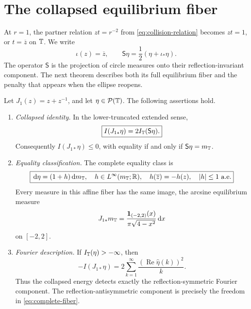 \section{The collapsed equilibrium fiber}\label{sec:collapsed-fiber}

At \(r=1\), the partner relation \(zt=r^{-2}\) from
\eqref{eq:collision-relation} becomes \(zt=1\), or
\(t=\overline z\) on \(\mathbb{T}\).  We write
\[
 \iota(z)=\overline z,
 \qquad
 \mathsf S\eta=\frac12(\eta+\iota_\ast\eta).
\]
The operator \(\mathsf S\) is the projection of circle measures onto
their reflection-invariant component.  The next theorem describes both
its full equilibrium fiber and the penalty that appears when the
ellipse reopens.

\begin{theorem}\label{thm:collapsed-selection}
Let \(J_1(z)=z+z^{-1}\), and let
\(\eta\in\mathcal P(\mathbb{T})\).  The following assertions hold.

\begin{enumerate}[label=\textup{(\alph*)},leftmargin=*]
\item \emph{Collapsed identity.}  In the lower-truncated extended
sense,
\begin{equation}\label{eq:collapsed-identity}
 \boxed{I(J_{1\ast}\eta)=2I_{\mathbb{T}}(\mathsf S\eta).}
\end{equation}
Consequently \(I(J_{1\ast}\eta)\leq0\), with equality if and only if
\(\mathsf S\eta=m_{\mathbb{T}}\).

\item \emph{Equality classification.}  The complete equality class is
\begin{equation}\label{eq:complete-fiber}
 \boxed{
 \,\mathrm{d}\eta=(1+h)\,\mathrm{d} m_{\mathbb{T}},\quad
 h\in L^\infty(m_{\mathbb{T}};\mathbb{R}),\quad
 h(\overline z)=-h(z),\quad |h|\leq1\ \text{a.e.}}
\end{equation}
Every measure in this affine fiber has the same image, the arcsine
equilibrium measure
\begin{equation}\label{eq:arcsine-measure}
 J_{1\ast}m_{\mathbb{T}}
 =\frac{\mathbf1_{(-2,2)}(x)}{\pi\sqrt{4-x^2}}\,\mathrm{d} x
\end{equation}
on \([-2,2]\).

\item \emph{Fourier description.}  If
\(I_{\mathbb{T}}(\eta)>-\infty\), then
\begin{equation}\label{eq:endpoint-fourier}
 -I(J_{1\ast}\eta)
 =2\sum_{k=1}^{\infty}
 \frac{(\operatorname{Re}\widehat\eta(k))^2}{k}.
\end{equation}
Thus the collapsed energy detects exactly the reflection-symmetric
Fourier component.  The reflection-antisymmetric component is precisely
the freedom in \eqref{eq:complete-fiber}.


\end{enumerate}
\end{theorem}
